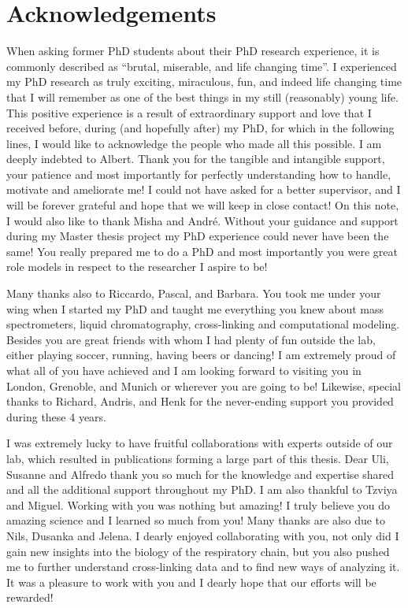 \section{Acknowledgements}
When asking former PhD students about their PhD research experience, it is commonly described as “brutal, miserable, and life changing time”. I experienced my PhD research as truly exciting, miraculous, fun, and indeed life changing time that I will remember as one of the best things in my still (reasonably) young life. This positive experience is a result of extraordinary support and love that I received before, during (and hopefully after) my PhD, for which in the following lines, I would like to acknowledge the people who made all this possible.
I am deeply indebted to Albert. Thank you for the tangible and intangible support, your patience and most importantly for perfectly understanding how to handle, motivate and ameliorate me! I could not have asked for a better supervisor, and I will be forever grateful and hope that we will keep in close contact! On this note, I would also like to thank Misha and André. Without your guidance and support during my Master thesis project my PhD experience could never have been the same! You really prepared me to do a PhD and most importantly you were great role models in respect to the researcher I aspire to be!

Many thanks also to Riccardo, Pascal, and Barbara. You took me under your wing when I started my PhD and taught me everything you knew about mass spectrometers, liquid chromatography, cross-linking and computational modeling. Besides you are great friends with whom I had plenty of fun outside the lab, either playing soccer, running, having beers or dancing! I am extremely proud of what all of you have achieved and I am looking forward to visiting you in London, Grenoble, and Munich or wherever you are going to be! Likewise, special thanks to Richard, Andris, and Henk for the never-ending support you provided during these 4 years.

I was extremely lucky to have fruitful collaborations with experts outside of our lab, which resulted in publications forming a large part of this thesis. Dear Uli, Susanne and Alfredo thank you so much for the knowledge and expertise shared and all the additional support throughout my PhD. I am also thankful to Tzviya and Miguel. Working with you was nothing but amazing! I truly believe you do amazing science and I learned so much from you! Many thanks are also due to Nils, Dusanka and Jelena. I dearly enjoyed collaborating with you, not only did I gain new insights into the biology of the respiratory chain, but you also pushed me to further understand cross-linking data and to find new ways of analyzing it. It was a pleasure to work with you and I dearly hope that our efforts will be rewarded!

